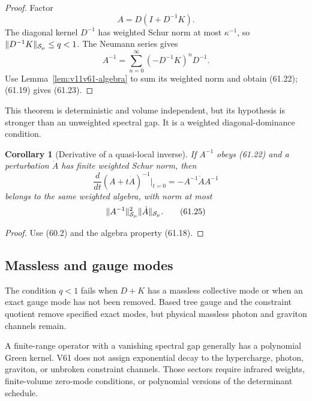 \documentclass[11pt]{article}
\newtheorem{corollary}[theorem]{Corollary}
\begin{document}
\begin{proof}
Factor
\[
                         A=D(I+D^{-1}K).
\]
The diagonal kernel \(D^{-1}\) has weighted Schur norm at most
\(\kappa^{-1}\), so
\(\lVert D^{-1}K\rVert_{{\cal S}_\mu}\le q<1\).
The Neumann series gives
\[
 A^{-1}=\sum_{n=0}^{\infty}(-D^{-1}K)^nD^{-1}.
\]
Use Lemma~\ref{lem:v11v61-algebra} to sum its weighted norm and obtain
(61.22); (61.19) gives (61.23).
\end{proof}

This theorem is deterministic and volume independent, but its
hypothesis is stronger than an unweighted spectral gap.  It is a
weighted diagonal-dominance condition.

\begin{corollary}[Derivative of a quasi-local inverse]
\label{cor:v11v61-derivative}
If \(A^{-1}\) obeys (61.22) and a perturbation \(\dot A\) has finite
weighted Schur norm, then
\[
                  \frac d{dt}(A+t\dot A)^{-1}\big|_{t=0}
                             =-A^{-1}\dot A A^{-1}             \tag{61.24}
\]
belongs to the same weighted algebra, with norm at most
\[
              \lVert A^{-1}\rVert_{{\cal S}_\mu}^2
                    \lVert\dot A\rVert_{{\cal S}_\mu}.        \tag{61.25}
\]
\end{corollary}

\begin{proof}
Use (60.2) and the algebra property (61.18).
\end{proof}

\subsection{Massless and gauge modes}

The condition \(q<1\) fails when \(D+K\) has a massless collective mode
or when an exact gauge mode has not been removed.  Based tree gauge and
the constraint quotient remove specified exact modes, but physical
massless photon and graviton channels remain.

\begin{warning}
\label{warn:v11v61-massless}
A finite-range operator with a vanishing spectral gap generally has a
polynomial Green kernel.  V61 does not assign exponential decay to the
hypercharge, photon, graviton, or unbroken constraint channels.  Those
sectors require infrared weights, finite-volume zero-mode conditions,
or polynomial versions of the determinant schedule.
\end{warning}
\end{document}
